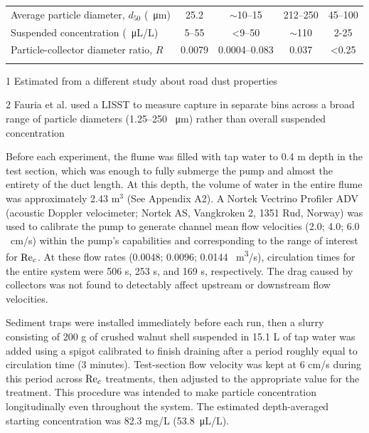 \documentclass[geosciences,article,submit,moreauthors,pdftex]{Definitions/mdpi}
\begin{document}
\begin{table}[h]
\begin{threeparttable}
\begin{tabular}{lcccc}
Average particle diameter, $d_{50}$ (\SI{}{\micro\metre})     
& 25.2        & $\sim$10--15 \tnote{2} & 212--250     & 45--100 \cite{hejduk2010variations,noe2010glades}  \\
Suspended concentration (\SI{}{\micro\liter/\liter})      
& 5--55   & <9--50 \tnote{2}      & $\sim$110   & 2-25 \cite{noe2010glades,aiona2013can}      \\
\midrule
Particle-collector diameter ratio, $R$      
&0.0079       &0.0004--0.083 \tnote{2} & 0.037        & <0.25     \\
\bottomrule
\vspace{-4mm}
\end{tabular}
\begin{tablenotes}
\footnotesize \item[1] Estimated from a different study about road dust properties \cite{mckenzie2008size} 
\vspace{2mm}
\footnotesize \item[2] Fauria et al. \cite{Fauria_2015} used a LISST to measure capture in separate bins across a broad range of particle diameters (1.25--250 \SI{}{\micro\metre}) rather than overall suspended concentration
\end{tablenotes}
\end{threeparttable}
\label{tbl:parameters}
\end{table}

Before each experiment, the flume was filled with tap water to 0.4 m depth in the test section, which was enough to fully submerge the pump and almost the entirety of the duct length. At this depth, the volume of water in the entire flume was approximately 2.43 m$^3$ (See Appendix A2).  A Nortek Vectrino Profiler ADV (acoustic Doppler velocimeter; Nortek AS, Vangkroken 2, 1351 Rud, Norway) was used to calibrate the pump to generate channel mean flow velocities (2.0; 4.0; 6.0 \SI{}{\centi\metre/\second}) within the pump's capabilities and corresponding to the range of interest for $\mathrm{Re}_c$. At these flow rates (0.0048; 0.0096; 0.0144 \SI{}{\metre\cubed/\second}), circulation times for the entire system were 506 s, 253 s, and 169 s, respectively. The drag caused by collectors was not found to detectably affect upstream or downstream flow velocities.

Sediment traps were installed immediately before each run, then a slurry consisting of 200 g of crushed walnut shell suspended in 15.1 L of tap water was added using a spigot calibrated to finish draining after a period roughly equal to circulation time (3 minutes). Test-section flow velocity was kept at 6 cm/s during this period across $\mathrm{Re}_c$ treatments, then adjusted to the appropriate value for the treatment. This procedure was intended to make particle concentration longitudinally even throughout the system. The estimated depth-averaged starting concentration was 82.3 mg/L (\SI{53.8}{\micro\liter/\liter}).
\end{document}
